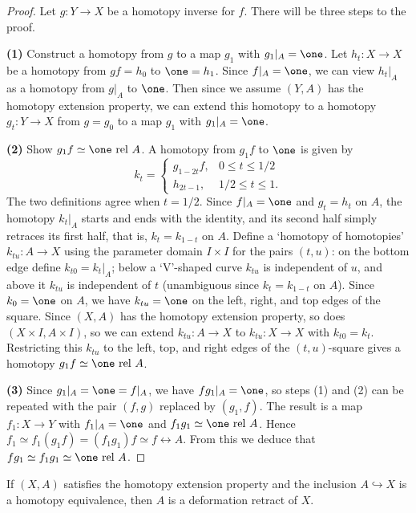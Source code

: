 \begin{proof}
\leanok
Let $g : Y \to X$ be a homotopy inverse for $f$. There will be three steps to the proof.

\textbf{(1)} Construct a homotopy from $g$ to a map $g_1$ with $g_1|_A = \one$. Let
$h_t : X \to X$ be a homotopy from $gf = h_0$ to $\one = h_1$. Since $f|_A = \one$, we can
view $h_t|_A$ as a homotopy from $g|_A$ to $\one$. Then since we assume $(Y,A)$ has the
homotopy extension property, we can extend this homotopy to a homotopy
$g_t : Y \to X$ from $g = g_0$ to a map $g_1$ with $g_1|_A = \one$.

\textbf{(2)} Show $g_1 f \simeq \one \rel A$. A homotopy from $g_1 f$ to $\one$ is given by
\[
k_t =
\begin{cases}
g_{1-2t} f, & 0 \le t \le 1/2 \\
h_{2t-1}, & 1/2 \le t \le 1.
\end{cases}
\]
The two definitions agree when $t = 1/2$. Since $f|_A = \one$ and $g_t = h_t$ on $A$, the
homotopy $k_t|_A$ starts and ends with the identity, and its second half simply retraces
its first half, that is, $k_t = k_{1-t}$ on $A$. Define a `homotopy of homotopies'
$k_{tu} : A \to X$ using the parameter domain $I \times I$ for the pairs $(t,u)$: on the
bottom edge define $k_{t0} = k_t|_A$; below a `V'-shaped curve $k_{tu}$ is independent of
$u$, and above it $k_{tu}$ is independent of $t$ (unambiguous since $k_t = k_{1-t}$ on $A$).
Since $k_0 = \one$ on $A$, we have $k_{tu} = \one$ on the left, right, and top edges of the
square. Since $(X,A)$ has the homotopy extension property, so does
$(X \times I, A \times I)$, so we can extend $k_{tu} : A \to X$ to $k_{tu} : X \to X$ with
$k_{t0} = k_t$. Restricting this $k_{tu}$ to the left, top, and right edges of the
$(t,u)$-square gives a homotopy $g_1 f \simeq \one \rel A$.



\textbf{(3)} Since $g_1|_A = \one = f|_A$, we have $fg_1|_A = \one$, so steps (1) and (2) can be
repeated with the pair $(f,g)$ replaced by $(g_1,f)$. The result is a map
$f_1 : X \to Y$ with $f_1|_A = \one$ and $f_1 g_1 \simeq \one \rel A$. Hence
$f_1 \simeq f_1(g_1 f) = (f_1 g_1) f \simeq f \rel A$. From this we deduce that
$f g_1 \simeq f_1 g_1 \simeq \one \rel A$.
\end{proof}

\begin{corollary}
\label{cor:hep-inclusion-homotopy-equiv-deformation-retract}
\leanok
{}
If $(X,A)$ satisfies the homotopy extension property and the inclusion
$A \hookrightarrow X$ is a homotopy equivalence, then $A$ is a deformation retract of $X$.
\end{corollary}

